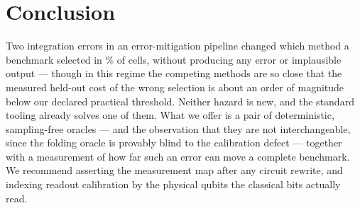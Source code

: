 \documentclass[10pt,conference]{IEEEtran}
\begin{document}
\section{Conclusion}
Two integration errors in an error-mitigation pipeline changed which method a benchmark selected in
\FlipRateAllPct\% of cells, without producing any error or implausible output --- though in this
regime the competing methods are so close that the measured held-out cost of the wrong selection is
about an order of magnitude below our declared practical threshold. Neither hazard is new, and the standard tooling
already solves one of them. What we offer is a pair of deterministic, sampling-free oracles --- and
the observation that they are not interchangeable, since the folding oracle is provably blind to the
calibration defect --- together with a measurement of how far such an error can move a complete
benchmark. We recommend asserting the measurement map after any circuit rewrite, and indexing
readout calibration by the physical qubits the classical bits actually read.

\balance


\end{document}
